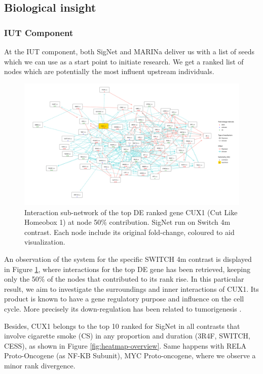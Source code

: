 \subsection{Biological insight}
\subsubsection{IUT Component}
At the IUT component, both SigNet and MARINa deliver us with a list of seeds which we can use as a start point to initiate research. We get a ranked list of nodes which are potentially the most influent upstream individuals.
\\

\begin{figure}[!hb]
    \centering
    \includegraphics[width=\textwidth, height=\textheight, keepaspectratio]{Major Thesis/figures/iut/graph/SWITCH4m50-CUX1.png}
    \caption{Interaction sub-network of the top DE ranked gene CUX1 (Cut Like Homeobox 1) at node 50\% contribution. SigNet run on Switch 4m contrast. Each node include its original fold-change, coloured to aid visualization.}
    \label{fig:graph-expansion}
\end{figure}

An observation of the system for the specific SWITCH 4m contrast is displayed in Figure \ref{fig:graph-expansion}, where interactions for the top DE gene has been retrieved, keeping only the 50\% of the nodes that contributed to its rank rise. In this particular result, we aim to investigate the surroundings and inner interactions of CUX1. Its product is known to have a gene regulatory purpose and influence on the cell cycle. More precisely its down-regulation has been related to tumorigenesis \cite{Wong2014InactivatingTumorigenesis}.


Besides, CUX1 belongs to the top 10 ranked for SigNet in all contrasts that involve cigarette smoke (CS) in any proportion and duration (3R4F, SWITCH, CESS), as shown in Figure \ref{fig:heatmap-overview}. Same happens with RELA Proto-Oncogene (as NF-KB Subunit), MYC Proto-oncogene, where we observe a minor rank divergence.
\\

